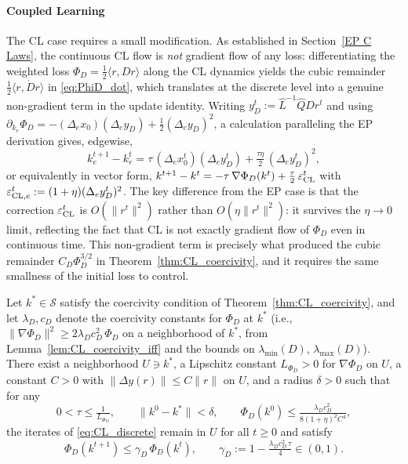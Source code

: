 \documentclass{siamart}
\begin{document}
\paragraph{Coupled Learning}

The CL case requires a small modification. As established in Section~\ref{EP C Laws}, the continuous CL flow is \emph{not} gradient flow of any loss: differentiating the weighted loss $\Phi_D = \tfrac{1}{2}\langle r, Dr\rangle$ along the CL dynamics yields the cubic remainder $\tfrac{1}{2}\langle r, \dot D r\rangle$ in \eqref{eq:PhiD_dot}, which translates at the discrete level into a genuine non-gradient term in the update identity. Writing $y_D^t := \hat{L}^{-1}\hat{Q}D r^t$ and using $\partial_{k_e}\Phi_D = -(\Delta_e x_0)(\Delta_e y_D) + \tfrac{1}{2}(\Delta_e y_D)^2$, a calculation paralleling the EP derivation gives, edgewise,
\begin{equation}\label{eq:CL_discrete}
k_e^{t+1} - k_e^t = \tau\,(\Delta_e x_0^t)(\Delta_e y_D^t) + \tfrac{\tau\eta}{2}\,(\Delta_e y_D^t)^2,
\end{equation}
or equivalently in vector form, $k^{t+1} - k^t = -\tau\,\nabla\Phi_D(k^t) + \tfrac{\tau}{2}\,\varepsilon_{\rm CL}^t$ with $\varepsilon^t_{{\rm CL},e} := (1+\eta)(\Delta_e y_D^t)^2$. The key difference from the EP case is that the correction $\varepsilon_{\rm CL}^t$ is $O(\|r^t\|^2)$ rather than $O(\eta\|r^t\|^2)$: it survives the $\eta \to 0$ limit, reflecting the fact that CL is not exactly gradient flow of $\Phi_D$ even in continuous time. This non-gradient term is precisely what produced the cubic remainder $C_D \Phi_D^{3/2}$ in Theorem~\ref{thm:CL_coercivity}, and it requires the same smallness of the initial loss to control.

\begin{theorem}\label{thm:discrete_CL}
Let $k^* \in \mathcal{S}$ satisfy the coercivity condition of Theorem~\ref{thm:CL_coercivity}, and let $\lambda_D, c_D$ denote the coercivity constants for $\Phi_D$ at $k^*$ (i.e., $\|\nabla\Phi_D\|^2 \ge 2\lambda_D c_D^2\,\Phi_D$ on a neighborhood of $k^*$, from Lemma~\ref{lem:CL_coercivity_iff} and the bounds on $\lambda_{\min}(D)$, $\lambda_{\max}(D)$). There exist a neighborhood $U \ni k^*$, a Lipschitz constant $L_{\Phi_D} > 0$ for $\nabla\Phi_D$ on $U$, a constant $C > 0$ with $\|\Delta y(r)\| \le C\|r\|$ on $U$, and a radius $\delta > 0$ such that for any
\[
0 < \tau \le \tfrac{1}{L_{\Phi_D}}, \qquad \|k^0 - k^*\| < \delta, \qquad \Phi_D(k^0) \le \tfrac{\lambda_D c_D^2}{8(1+\eta)^2 C^4},
\]
the iterates of \eqref{eq:CL_discrete} remain in $U$ for all $t \ge 0$ and satisfy
\[
\Phi_D(k^{t+1}) \le \gamma_D\,\Phi_D(k^t), \qquad \gamma_D := 1 - \tfrac{\lambda_D c_D^2\,\tau}{4} \in (0,1).
\]
\end{theorem}
\end{document}
